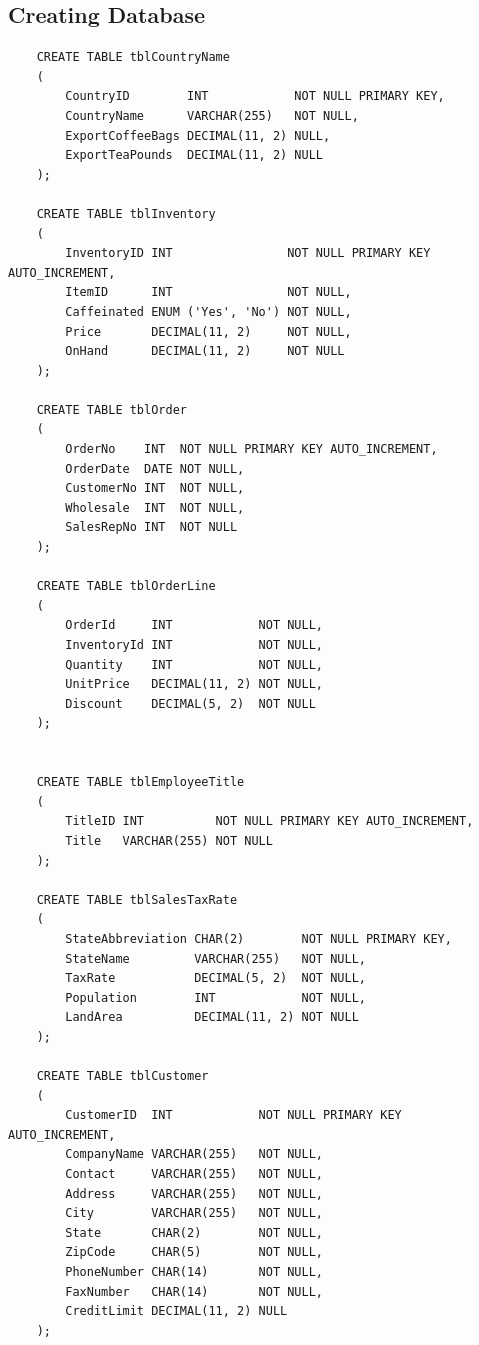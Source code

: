 \documentclass[12pt,titlepage]{article}
\begin{document}
\subsection{Creating Database}
\begin{verbatim}
    CREATE TABLE tblCountryName
    (
        CountryID        INT            NOT NULL PRIMARY KEY,
        CountryName      VARCHAR(255)   NOT NULL,
        ExportCoffeeBags DECIMAL(11, 2) NULL,
        ExportTeaPounds  DECIMAL(11, 2) NULL
    );
    
    CREATE TABLE tblInventory
    (
        InventoryID INT                NOT NULL PRIMARY KEY AUTO_INCREMENT,
        ItemID      INT                NOT NULL,
        Caffeinated ENUM ('Yes', 'No') NOT NULL,
        Price       DECIMAL(11, 2)     NOT NULL,
        OnHand      DECIMAL(11, 2)     NOT NULL
    );
    
    CREATE TABLE tblOrder
    (
        OrderNo    INT  NOT NULL PRIMARY KEY AUTO_INCREMENT,
        OrderDate  DATE NOT NULL,
        CustomerNo INT  NOT NULL,
        Wholesale  INT  NOT NULL,
        SalesRepNo INT  NOT NULL
    );
    
    CREATE TABLE tblOrderLine
    (
        OrderId     INT            NOT NULL,
        InventoryId INT            NOT NULL,
        Quantity    INT            NOT NULL,
        UnitPrice   DECIMAL(11, 2) NOT NULL,
        Discount    DECIMAL(5, 2)  NOT NULL
    );
    
    
    CREATE TABLE tblEmployeeTitle
    (
        TitleID INT          NOT NULL PRIMARY KEY AUTO_INCREMENT,
        Title   VARCHAR(255) NOT NULL
    );
    
    CREATE TABLE tblSalesTaxRate
    (
        StateAbbreviation CHAR(2)        NOT NULL PRIMARY KEY,
        StateName         VARCHAR(255)   NOT NULL,
        TaxRate           DECIMAL(5, 2)  NOT NULL,
        Population        INT            NOT NULL,
        LandArea          DECIMAL(11, 2) NOT NULL
    );
    
    CREATE TABLE tblCustomer
    (
        CustomerID  INT            NOT NULL PRIMARY KEY AUTO_INCREMENT,
        CompanyName VARCHAR(255)   NOT NULL,
        Contact     VARCHAR(255)   NOT NULL,
        Address     VARCHAR(255)   NOT NULL,
        City        VARCHAR(255)   NOT NULL,
        State       CHAR(2)        NOT NULL,
        ZipCode     CHAR(5)        NOT NULL,
        PhoneNumber CHAR(14)       NOT NULL,
        FaxNumber   CHAR(14)       NOT NULL,
        CreditLimit DECIMAL(11, 2) NULL
    );
    

\end{verbatim}
\end{document}
